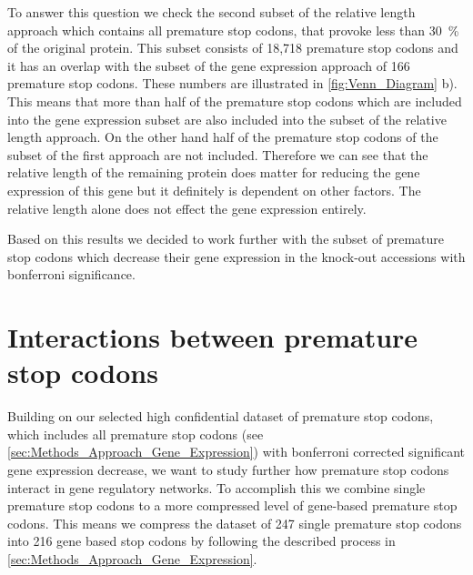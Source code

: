 To answer this question we check the second subset of the relative length approach which contains all premature stop codons, that provoke less than \SI{30}{\percent} of the original protein. This subset consists of 18,718 premature stop codons and it has an overlap with the subset of the gene expression approach of 166 premature stop codons. These numbers are illustrated in \autoref{fig:Venn_Diagram} b). This means that more than half of the premature stop codons which are included into the gene expression subset are also included into the subset of the relative length approach. On the other hand half of the premature stop codons of the subset of the first approach are not included. Therefore we can see that the relative length of the remaining protein does matter for reducing the gene expression of this gene but it definitely is dependent on other factors. The relative length alone does not effect the gene expression entirely. 

Based on this results we decided to work further with the subset of premature stop codons which decrease their gene expression in the knock-out accessions with bonferroni significance. 

\section{Interactions between premature stop codons}
Building on our selected high confidential dataset of premature stop codons, which includes all premature stop codons (see \autoref{sec:Methods_Approach_Gene_Expression}) with bonferroni corrected significant gene expression decrease, we want to study further how premature stop codons interact in gene regulatory networks. To accomplish this we combine single premature stop codons to a more compressed level of gene-based premature stop codons. This means we compress the dataset of 247 single premature stop codons into 216 gene based stop codons by following the described process in \autoref{sec:Methods_Approach_Gene_Expression}.

